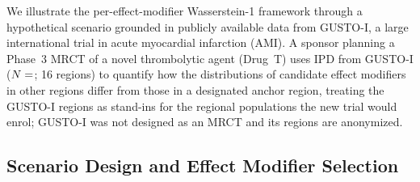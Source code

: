 \documentclass[AMA,Times1COL]{WileyNJDv5}
\begin{document}
We illustrate the per-effect-modifier Wasserstein-1 framework through a hypothetical scenario grounded in publicly available data from GUSTO-I, a large international trial in acute myocardial infarction (AMI). A sponsor planning a Phase~3 MRCT of a novel thrombolytic agent (Drug~T) uses IPD from GUSTO-I ($N = \numval{gustoN}$; 16 regions)\cite{gusto1993} to quantify how the distributions of candidate effect modifiers in other regions differ from those in a designated anchor region, treating the GUSTO-I regions as stand-ins for the regional populations the new trial would enrol; GUSTO-I was not designed as an MRCT and its regions are anonymized.

\subsection{Scenario Design and Effect Modifier Selection}\label{sec:app_scenario}
\end{document}
